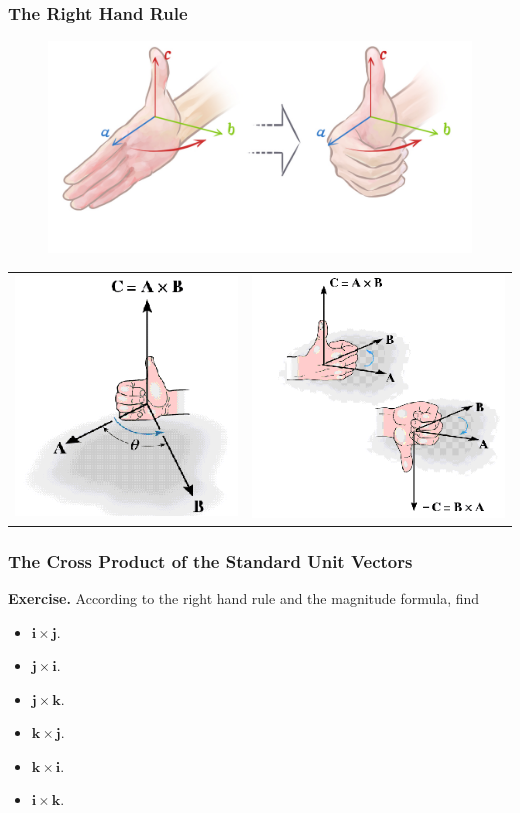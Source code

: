\documentclass[10pt]{beamer}
\begin{document}
\begin{frame}
\frametitle{The Right Hand Rule}
\begin{figure}
\includegraphics[width = .65\textwidth]{righthandrule1.png}
\end{figure}
\begin{tabular}{cc}
\includegraphics[width = .35\textwidth]{righthandrule2.png}&\includegraphics[width = .35\textwidth]{righthandrule3.png}
\end{tabular}
\end{frame}

\begin{frame}
\frametitle{The Cross Product of the Standard Unit Vectors}
{\bf Exercise.} According to the right hand rule and the magnitude formula, find 
\begin{itemize}[label = $\bullet$]
\item $\mathbf i\times\mathbf j$.
\item $\mathbf j\times\mathbf i$.
\item $\mathbf j\times\mathbf k$.
\item $\mathbf k\times\mathbf j$.
\item $\mathbf k\times\mathbf i$.
\item $\mathbf i\times\mathbf k$.
\end{itemize}
\end{frame}
\end{document}
